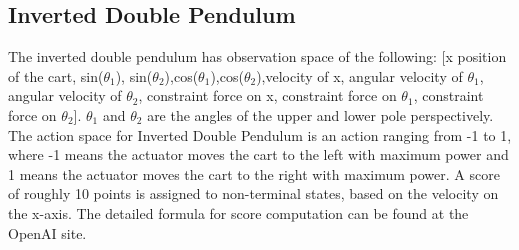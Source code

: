 \subsection{Inverted Double Pendulum}
The inverted double pendulum has observation space of the following: [x position of the cart, sin($\theta_1$), sin($\theta_2$),cos($\theta_1$),cos($\theta_2$),velocity of x, angular velocity of $\theta_1$, angular velocity of $\theta_2$, constraint force on x, constraint force on $\theta_1$, constraint force on $\theta_2$]. $\theta_1$ and $\theta_2$ are the angles of the upper and lower pole perspectively. The action space for Inverted Double Pendulum is an action ranging from -1 to 1, where -1 means the actuator moves the cart to the left with maximum power and 1 means the actuator moves the cart to the right with maximum power. A score of roughly 10 points is assigned to non-terminal states, based on the velocity on the x-axis. The detailed formula for score computation can be found at the OpenAI site.

